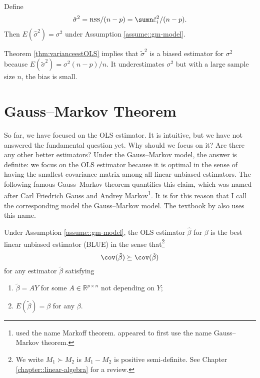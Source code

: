\begin{theorem}
\label{thm:varianceestOLS}Define 
$$
\hat{\sigma}^{2}=\textsc{rss}/(n-p)=\sumn\hat{\varepsilon}_{i}^{2}/(n-p).
$$
Then $E(\hat{\sigma}^{2})=\sigma^{2}$ under Assumption \ref{assume::gm-model}. 
\end{theorem}


Theorem \ref{thm:varianceestOLS} implies that $\tilde{\sigma}^{2}$
is a biased estimator for $\sigma^{2}$ because $E(\tilde{\sigma}^{2})=\sigma^{2}(n-p)/n.$
It underestimates $\sigma^{2}$ but with a large sample size $n$, the bias is
small. 

\section{Gauss--Markov Theorem}

So far, we have focused on the OLS estimator. It is intuitive, but
we have not answered the fundamental question yet. Why should we focus
on it? Are there any other better estimators? Under the Gauss--Markov
model, the answer is definite: we focus on the OLS estimator because
it is optimal in the sense of having the smallest covariance matrix
among all linear unbiased estimators. The following famous Gauss--Markov
theorem quantifies this claim, which was named after Carl Friedrich Gauss and Andrey Markov\footnote{\citet{david1938extensions} used the name Markoff theorem. \citet{lehmann1951general} appeared to first use the name Gauss--Markov theorem.}. It is for this reason that I call the
corresponding model the Gauss--Markov model. The textbook by \citet{monahan2008primer} also uses this name. 







\begin{theorem}
\label{thm:GMtheorem}Under Assumption \ref{assume::gm-model}, the OLS estimator
$\hat{\beta}$ for $\beta$ is the best linear unbiased estimator
(BLUE) in the sense that\footnote{We write $M_1 \succ M_2$  is $M_1 - M_2$ is positive semi-definite. See Chapter \ref{chapter::linear-algebra} for a review.} 
$$
\cov(\tilde{\beta})  \succeq 
\cov(\hat{\beta})
$$
for any estimator $\tilde{\beta}$ satisfying 
\begin{enumerate}
[(C1)]
\item\label{item::gm-linear} $\tilde{\beta}=AY$ for some $A\in\mathbb{R}^{p\times n}$ not depending
on $Y$;
\item\label{item::gm-unbiased} $ E (\tilde{\beta} ) = \beta$   for any
$\beta$.
\end{enumerate}
\end{theorem}

